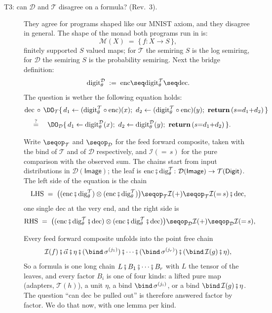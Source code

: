 \documentclass[anon]{../../journal-templates/NeSy26/nesy2026} %
\begin{document}
\begin{description}
\item[T3: can $\mathcal D$ and $\mathcal T$ disagree on a formula? (Rev.~3).]
They agree for programs shaped
like our MNIST axiom, and they disagree in general. The shape of the monad both programs run in is:
\[
  \mathcal M(X) \;=\; \{\, f : X \to S \,\},
\]
finitely supported $S$ valued maps; for $\mathcal T$ the semiring $S$ is
the log semiring, for $\mathcal D$ the semiring $S$ is the probability semiring. Next the bridge definition:
\[
  \mathrm{digit}^{\mathcal D}_\theta \;:=\;
  \mathrm{enc} \seq \mathrm{digit}^{\mathcal T}_\theta \seq  \mathrm{dec}.
\]
The question is wether the following equation holds:
\begin{align*}
  &\mathrm{dec} \,\circ\, \DO_{\mathcal T}\{\,
    d_1 \leftarrow (\mathrm{digit}^{\mathcal T}_\theta \circ \mathrm{enc})(x);\
    d_2 \leftarrow (\mathrm{digit}^{\mathcal T}_\theta \circ \mathrm{enc})(y);\
    \mathbf{return}\,(s {=} d_1 {+} d_2) \,\}
  \\[2pt]
  &\quad\overset{?}{=}\quad
  \DO_{\mathcal D}\{\,
    d_1 \leftarrow \mathrm{digit}^{\mathcal D}_\theta(x);\
    d_2 \leftarrow \mathrm{digit}^{\mathcal D}_\theta(y);\
    \mathbf{return}\,(s {=} d_1 {+} d_2) \,\}.
\end{align*}

Write
$\seqop_{\mathcal T}$ and $\seqop_{\mathcal D}$ for the feed forward
composite,
taken with the bind of $\mathcal T$ and of $\mathcal D$ respectively, and
$\mathcal I({=}\,s)$ for the pure comparison with the observed sum. The
chains start from input distributions in
$\mathcal D(\mathsf{Image})$; the leaf is
$\mathrm{enc} \fatsemi \mathrm{dig}^{\mathcal T}_\theta \colon
\mathcal D(\mathsf{Image}) \to \mathcal T(\mathsf{Digit})$. The left side
of the equation is the chain
\[
  \mathrm{LHS} \;=\;
  \bigl(
    (\mathrm{enc} \fatsemi \mathrm{dig}^{\mathcal T}_\theta)
    \otimes
    (\mathrm{enc} \fatsemi \mathrm{dig}^{\mathcal T}_\theta)
  \bigr)
  \seqop_{\mathcal T} \mathcal I(+)
  \seqop_{\mathcal T} \mathcal I({=}\,s)
  \fatsemi \mathrm{dec},
\]
one single $\mathrm{dec}$ at the very end, and the right side is
\[
  \mathrm{RHS} \;=\;
  \bigl(
    (\mathrm{enc} \fatsemi \mathrm{dig}^{\mathcal T}_\theta \fatsemi \mathrm{dec})
    \otimes
    (\mathrm{enc} \fatsemi \mathrm{dig}^{\mathcal T}_\theta \fatsemi \mathrm{dec})
  \bigr)
  \seqop_{\mathcal D} \mathcal I(+)
  \seqop_{\mathcal D} \mathcal I({=}\,s),
\]

Every feed
forward composite unfolds into the point free chain
\[
  \mathcal I(f) \fatsemi \vec\alpha \fatsemi \eta
  \fatsemi ({\bind}\,\sigma^{(j_1)}) \fatsemi \cdots
  \fatsemi ({\bind}\,\sigma^{(j_r)})
  \fatsemi ({\bind}\,\mathcal I(g) \fatsemi \eta),
\]
So a formula is one long chain $L \fatsemi B_1 \fatsemi \cdots \fatsemi
B_r$ with $L$ the tensor of the leaves, and every factor $B_i$ is one of
four kinds: a lifted pure map (adapters, $\mathcal T(h)$), a unit $\eta$, a bind ${\bind}\,\sigma^{(j_i)}$, or a bind ${\bind}\,\mathcal I(g) \fatsemi \eta$. The question
``can $\mathrm{dec}$ be pulled out'' is therefore answered factor by
factor. We do that now, with one lemma per kind.


\end{description}
\end{document}
